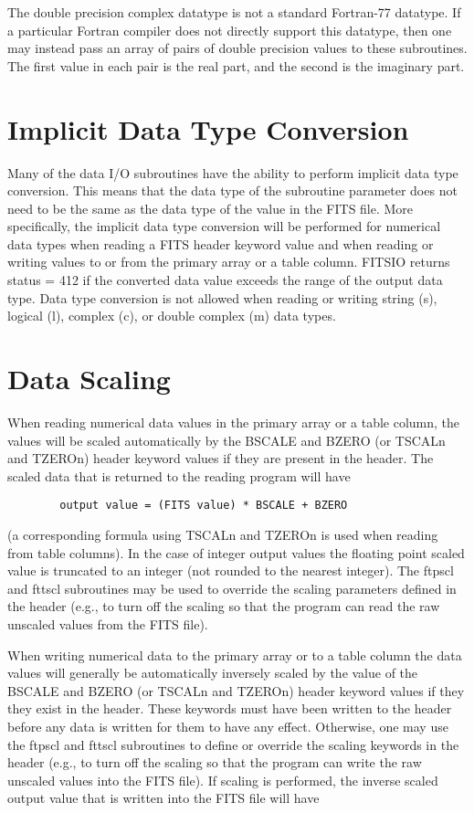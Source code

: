 \documentclass[11pt]{book}
\begin{document}
The double precision complex datatype is not a standard Fortran-77
datatype.  If a particular Fortran compiler does not directly support
this datatype,  then one may instead pass an array of pairs of double
precision values to these subroutines.  The first  value in each pair
is the real part, and the second is the imaginary part.


\section{Implicit Data Type Conversion}

Many of the data I/O subroutines have the ability to perform implicit
data type conversion. This means that the data type of the subroutine
parameter does not need to be the same as the data type of the value in
the FITS file. More specifically, the implicit data type conversion will
be performed for numerical data types when reading a FITS header keyword
value and when reading or writing values to or from the primary array or
a table column. FITSIO returns status = 412 if the converted data value
exceeds the range of the output data type. Data type conversion is not
allowed when reading or writing string (s), logical (l), complex (c), or
double complex (m) data types.


\section{Data Scaling}

When reading numerical data values in the primary array or a
table column, the values will be scaled automatically by the BSCALE and
BZERO (or TSCALn and TZEROn) header keyword values if they are
present in the header.  The scaled data that is returned to the reading
program will have

\begin{verbatim}
        output value = (FITS value) * BSCALE + BZERO
\end{verbatim}
(a corresponding formula using TSCALn and TZEROn is used when reading
from table columns).  In the case of integer output values the floating
point scaled value is truncated to an integer (not rounded to the
nearest integer).  The ftpscl and fttscl subroutines may be used to
override the scaling parameters defined in the header (e.g., to turn
off the scaling so that the program can read the raw unscaled values
from the FITS file).

When writing numerical data to the primary array or to a table
column the data values will generally be automatically inversely scaled
by the value of the BSCALE and BZERO (or TSCALn and TZEROn) header
keyword values if they they exist in the header.  These keywords must
have been written to the header before any data is written for them to
have any effect.  Otherwise, one may use the ftpscl and fttscl
subroutines to define or override the scaling keywords in the header
(e.g., to turn off the scaling so that the program can write the raw
unscaled values into the FITS file). If scaling is performed, the
inverse scaled output value that is written into the FITS file will
have
\end{document}
